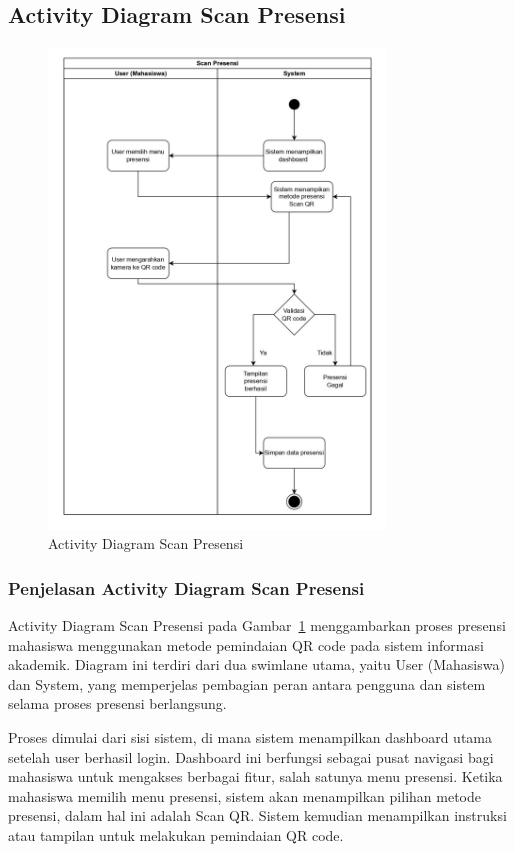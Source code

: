 \documentclass[a4paper,oneside,11pt]{book}
\begin{document}
\subsection{Activity Diagram Scan Presensi}
\begin{figure}[H]
  \centering
  \includegraphics[width=0.8\textwidth]{Activity Diagram/Scan Presensi.jpg}
  \caption{Activity Diagram Scan Presensi}
  \label{fig:activity_scan_presensi}
\end{figure}

\subsubsection{Penjelasan Activity Diagram Scan Presensi}
Activity Diagram Scan Presensi pada Gambar~\ref{fig:activity_scan_presensi} menggambarkan proses presensi mahasiswa menggunakan metode pemindaian QR code pada sistem informasi akademik. Diagram ini terdiri dari dua swimlane utama, yaitu User (Mahasiswa) dan System, yang memperjelas pembagian peran antara pengguna dan sistem selama proses presensi berlangsung.

Proses dimulai dari sisi sistem, di mana sistem menampilkan dashboard utama setelah user berhasil login. Dashboard ini berfungsi sebagai pusat navigasi bagi mahasiswa untuk mengakses berbagai fitur, salah satunya menu presensi. Ketika mahasiswa memilih menu presensi, sistem akan menampilkan pilihan metode presensi, dalam hal ini adalah Scan QR. Sistem kemudian menampilkan instruksi atau tampilan untuk melakukan pemindaian QR code.
\end{document}
